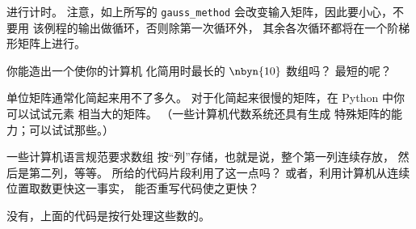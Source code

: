 \begin{exercises}
\begin{answer}
      进行计时。
      注意，如上所写的 \lstinline[style=inline]!gauss_method!
      会改变输入矩阵，因此要小心，不要用
      该例程的输出做循环，否则除第一次循环外，
      其余各次循环都将在一个阶梯形矩阵上进行。
    \end{answer}
  \item
    你能造出一个使你的计算机
    化简用时最长的 $\nbyn{10}$ 数组吗？
    最短的呢？
    \begin{answer}
      单位矩阵通常化简起来用不了多久。
      对于化简起来很慢的矩阵，在 Python 中你可以试试元素
      相当大的矩阵。
      （一些计算机代数系统还具有生成
      特殊矩阵的能力；可以试试那些。）
    \end{answer}
  \item 一些计算机语言规范要求数组
    按“列”存储，也就是说，整个第一列连续存放，
    然后是第二列，等等。
    所给的代码片段利用了这一点吗？
    或者，利用计算机从连续位置取数更快这一事实，
    能否重写代码使之更快？
    \begin{answer}
      没有，上面的代码是按行处理这些数的。
    \end{answer}
\end{exercises}
\endinput
